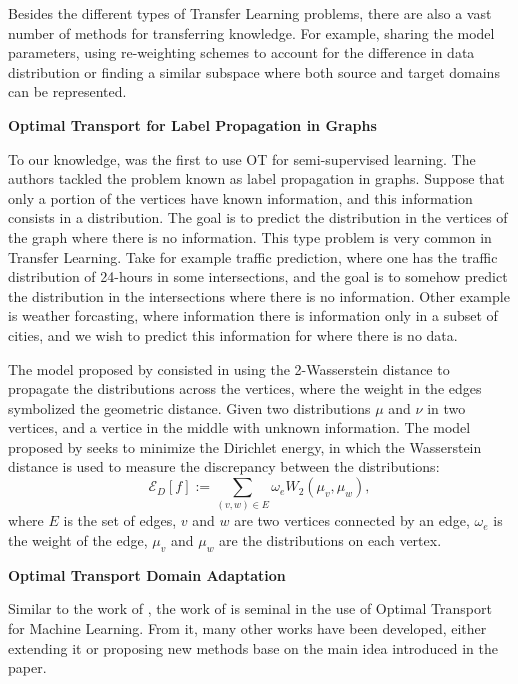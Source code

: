 Besides the different types of Transfer Learning problems,
there are also a vast number of methods for transferring knowledge. For example,
sharing the model parameters, using re-weighting
schemes to account for the difference in data distribution or
finding a similar subspace where both source and target domains can be represented.

\vspace{5mm}
\noindent \textbf{Optimal Transport for Label Propagation in Graphs}
\vspace{3mm}

To our knowledge, \citet{solomon2014wasserstein} was the first to use OT for semi-supervised learning.
The authors tackled the problem known as label propagation in graphs.
Suppose that only a portion of the vertices have known information, and this information consists in
a distribution. The goal is to predict the distribution in the vertices of the graph where
there is no information. This type problem is very common in Transfer Learning. Take for example traffic prediction,
where one has the traffic distribution of 24-hours in some intersections, and the goal is to
somehow predict the distribution in the intersections where there is no information. Other example is
weather forcasting, where information there is information only in a subset of cities, and we wish to predict
this information for where there is no data.

The model proposed by \citet{solomon2014wasserstein} consisted in using the 2-Wasserstein distance to
propagate the distributions across the vertices, where the weight in the edges symbolized the geometric distance.
Given two distributions $\mu$ and $\nu$ in two vertices, and a vertice in the middle with unknown information.
The model proposed by \citet{solomon2014wasserstein} seeks to minimize the Dirichlet energy, in which the
Wasserstein distance is used to measure the discrepancy between the distributions:
\begin{equation}
  \mathcal{E}_D[f]:= \sum_{(v,w)\in E} \omega_e W_2(\mu_v, \mu_w),
\end{equation}
where $E$ is the set of edges, $v$ and $w$ are two vertices connected by an edge, $\omega_e$ is the weight
of the edge, $\mu_v$ and $\mu_w$ are the distributions on each vertex.


\vspace{5mm}
\noindent \textbf{Optimal Transport Domain Adaptation}
\vspace{3mm}

Similar to the work of \citet{arjovsky2017wasserstein}, the work of \citet{courty2014domain}
is seminal in the use of Optimal Transport for Machine Learning. From it, many
other works have been developed, either extending it or proposing new methods base
on the main idea introduced in the paper.

